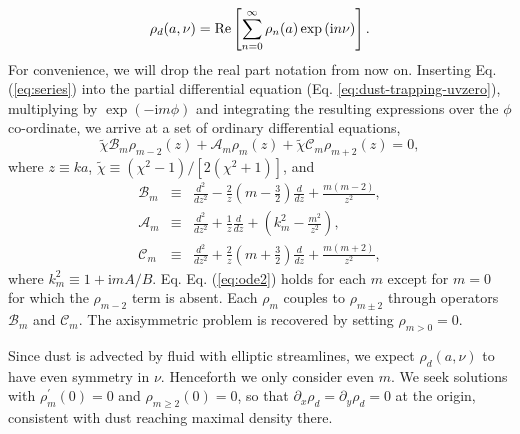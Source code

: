 \documentclass[apj]{emulateapj}
\def\brown#1{\textcolor{brown}{#1}}
\newcommand{\comm}[1]{({\it \brown{#1}})}
\newcommand{\Eq}[1]{Eq. (\ref{#1})}
\newcommand{\eq}[1]{\Eq{#1}}
\newcommand{\eqp}[1]{(Eq. \ref{#1})}
\newcommand{\beq}{\begin{equation}}
\newcommand{\eeq}{\end{equation}}
\newcommand{\beqn}{\begin{eqnarray}}
\newcommand{\eeqn}{\end{eqnarray}}
\begin{document}
\beq\label{eq:series}
\rho_d(a,\nu) = {\rm Re}
\left[\sum_{n=0}^\infty\rho_n(a)\exp{\left(\mathrm{i}n\nu\right)} \right].
\eeq
For convenience, we will drop the real part notation from now on. Inserting
\eq{eq:series} into the partial differential equation \eqp{eq:dust-trapping-uvzero},
multiplying by $\exp{(-\mathrm{i}m\phi)}$ and integrating the resulting
expressions over the $\phi$ co-ordinate, we arrive at a set of 
ordinary differential equations, 
\beq\label{eq:ode2}
\tilde{\chi}\mathcal{B}_m\rho_{m-2}(z) + \mathcal{A}_m\rho_m(z) + \tilde{\chi}\mathcal{C}_m\rho_{m+2}(z)=0,
\eeq
where $z\equiv ka$, $\tilde{\chi}\equiv(\chi^2-1)/[2(\chi^2+1)]$, and 
\beqn\label{eq:ops}
\mathcal{B}_m &\equiv& \frac{d^2}{dz^2} -
\frac{2}{z}\left(m-\frac{3}{2}\right)\frac{d}{dz} + \frac{m(m-2)}{z^2},\\
\mathcal{A}_m &\equiv& \frac{d^2}{dz^2} + \frac{1}{z}\frac{d}{dz} +
\left(k_m^2 - \frac{m^2}{z^2}\right),\\
\mathcal{C}_m  &\equiv& \frac{d^2}{dz^2} +
\frac{2}{z}\left(m+\frac{3}{2}\right)\frac{d}{dz} +
\frac{m(m+2)}{z^2}, 
\eeqn
where $k_m^2 \equiv 1+\mathrm{i}mA/B$. Eq. \eq{eq:ode2} holds for each
$m$ except for $m=0$ for which the $\rho_{m-2}$ term is absent. Each
$\rho_m$ couples to $\rho_{m\pm2}$ through operators $\mathcal{B}_m$
and $\mathcal{C}_m$. The axisymmetric problem is recovered by
setting $\rho_{m>0}=0$. 

Since dust is advected by fluid with elliptic streamlines, we
expect $\rho_d(a,\nu)$ to have even symmetry in $\nu$. Henceforth we
only consider even $m$. We seek solutions with  
$\rho_m^\prime(0)=0$ and $\rho_{m\geq2}(0)=0$, so that
$\partial_x\rho_d=\partial_y\rho_d=0$ at the origin, consistent with 
dust reaching maximal density there.  
\end{document}
